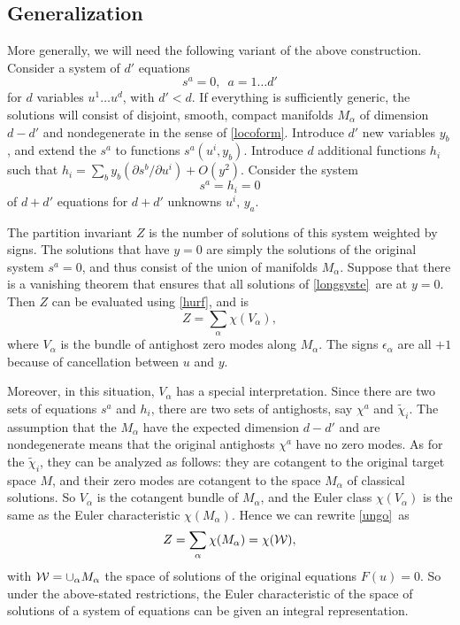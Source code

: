 \documentclass[12pt]{article}
\numberwithin{equation}{section}
\def\tilde{\widetilde}
\begin{document}
\subsection*{Generalization}

More generally, we will need the following variant of the above
construction.  Consider a system of $d'$ equations
\begin{equation}
  \label{kk}
  s^a=0,\,\,\,a=1\dots d'
\end{equation}
for $d$ variables $u^1\dots u^d$, with $d'<d$.  If everything
is sufficiently generic, the solutions will consist of disjoint, smooth,
compact manifolds
$M_\alpha$ of dimension $d-d'$ and nondegenerate in the sense of
\eqref{locoform}.
Introduce $d'$ new variables $y_b$, and extend the $s^a$ to
functions $s^a(u^i,y_b)$.
Introduce
$d$ additional functions
$h_i$ such that $h_i=\sum_by_b(\partial s^b/\partial u^i)+O(y^2)$.
Consider the system
\begin{equation}
  \label{longsyste}
  s^a=h_i=0
\end{equation}
of $d+d'$ equations for $d+d'$ unknowns $u^i,\,y_a$.

The partition invariant $Z$ is the
number of solutions of this system weighted by signs.
The solutions that have $y=0$
are simply the solutions of the original system $s^a=0$, and thus
consist of the union of manifolds $M_\alpha$. Suppose that there is
a vanishing theorem that ensures that all solutions of \eqref{longsyste}\
are at $y=0$. Then
$Z$ can be evaluated using \eqref{hurf}, and is
\begin{equation}
  \label{ungo}
  Z=\sum_\alpha \chi(V_\alpha),
\end{equation}
where $V_\alpha$ is the bundle of antighost zero modes along $M_\alpha$.
The signs $\epsilon_\alpha$ are all $+1$ because of cancellation
between $u$ and $y$.

Moreover, in this situation, $V_\alpha$ has a special interpretation.
Since there are two sets of equations $s^a$ and $h_i$, there are
two sets of antighosts, say $\chi^a$ and $\tilde \chi_i$.
The assumption that the $M_\alpha$ have the expected dimension
$d-d'$ and are nondegenerate
means that the original antighosts $\chi^a$ have no zero modes.
As for the $\tilde \chi_i$, they can be analyzed as follows:
they are cotangent to the original target space $M$, and
their
zero modes are cotangent to the space $M_\alpha$ of classical solutions.
So $V_\alpha$ is the cotangent bundle of $M_\alpha$,
and  the Euler class $\chi(V_\alpha)$ is the same
as the Euler characteristic $\chi(M_\alpha)$.
Hence we can rewrite \eqref{ungo}\ as
\begin{equation}
  \label{tungo}
  Z=\sum_\alpha\chi(M_\alpha) =\chi({\cal W}),
\end{equation}
with ${\cal W}=\cup_\alpha M_\alpha$
the space of solutions of the original equations $F(u)=0$.
So under the above-stated restrictions, the Euler characteristic
of the space of solutions of a system of equations can be given an
integral representation.
\end{document}
